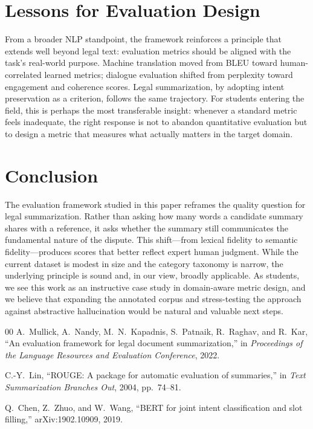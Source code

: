 \documentclass[conference]{IEEEtran}
\begin{document}
\section{Lessons for Evaluation Design}
From a broader NLP standpoint, the framework reinforces a principle that extends well beyond legal text: evaluation metrics should be aligned with the task's real-world purpose. Machine translation moved from BLEU toward human-correlated learned metrics; dialogue evaluation shifted from perplexity toward engagement and coherence scores. Legal summarization, by adopting intent preservation as a criterion, follows the same trajectory. For students entering the field, this is perhaps the most transferable insight: whenever a standard metric feels inadequate, the right response is not to abandon quantitative evaluation but to design a metric that measures what actually matters in the target domain.

\section{Conclusion}
The evaluation framework studied in this paper reframes the quality question for legal summarization. Rather than asking how many words a candidate summary shares with a reference, it asks whether the summary still communicates the fundamental nature of the dispute. This shift---from lexical fidelity to semantic fidelity---produces scores that better reflect expert human judgment. While the current dataset is modest in size and the category taxonomy is narrow, the underlying principle is sound and, in our view, broadly applicable. As students, we see this work as an instructive case study in domain-aware metric design, and we believe that expanding the annotated corpus and stress-testing the approach against abstractive hallucination would be natural and valuable next steps.

\begin{thebibliography}{00}
 A.~Mullick, A.~Nandy, M.~N.~Kapadnis, S.~Patnaik, R.~Raghav, and R.~Kar, ``An evaluation framework for legal document summarization,'' in \emph{Proceedings of the Language Resources and Evaluation Conference}, 2022.

 C.-Y.~Lin, ``ROUGE: A package for automatic evaluation of summaries,'' in \emph{Text Summarization Branches Out}, 2004, pp.~74--81.

 Q.~Chen, Z.~Zhuo, and W.~Wang, ``BERT for joint intent classification and slot filling,'' arXiv:1902.10909, 2019.
\end{thebibliography}
\end{document}
